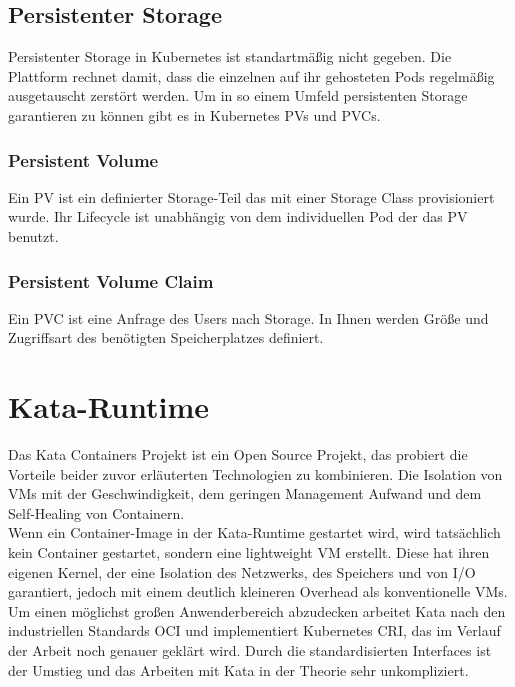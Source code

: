 \subsection{Persistenter Storage}
Persistenter Storage in Kubernetes ist standartmäßig nicht gegeben. 
Die Plattform rechnet damit, dass die einzelnen auf ihr gehosteten Pods regelmäßig ausgetauscht zerstört werden. 
Um in so einem Umfeld persistenten Storage garantieren zu können gibt es in Kubernetes \ac{PV}s und \ac{PVC}s.

\subsubsection{Persistent Volume}
Ein \ac{PV} ist ein definierter Storage-Teil das mit einer Storage Class provisioniert wurde.
Ihr Lifecycle ist unabhängig von dem individuellen Pod der das \ac{PV} benutzt.

\subsubsection{Persistent Volume Claim}
Ein \ac{PVC} ist eine Anfrage des Users nach Storage.
In Ihnen werden Größe und Zugriffsart des benötigten Speicherplatzes definiert. 


\section{Kata-Runtime}
Das Kata Containers Projekt ist ein Open Source Projekt, das probiert die Vorteile beider zuvor erläuterten Technologien zu kombinieren.
Die Isolation von \ac{VM}s mit der Geschwindigkeit, dem geringen Management Aufwand und dem Self-Healing von Containern.
\\
Wenn ein Container-Image in der Kata-Runtime gestartet wird, wird tatsächlich kein Container gestartet, sondern eine lightweight \ac{VM} erstellt.
Diese hat ihren eigenen Kernel, der eine Isolation des Netzwerks, des Speichers und von \ac{I/O} garantiert, jedoch mit einem deutlich kleineren Overhead als konventionelle \ac{VM}s.
Um einen möglichst großen Anwenderbereich abzudecken arbeitet Kata nach den industriellen Standards \ac{OCI} und implementiert Kubernetes \ac{CRI}, das im Verlauf der Arbeit noch genauer geklärt wird. 
Durch die standardisierten Interfaces ist der Umstieg und das Arbeiten mit Kata in der Theorie sehr unkompliziert. \cite{kata}

